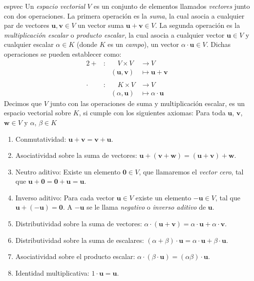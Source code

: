 \begin{definicion}{}{espvec}
    Un \emph{espacio vectorial} $V$ es un conjunto de elementos llamados \emph{vectores} junto con dos operaciones. La primera operación es la \emph{suma}, la cual asocia a cualquier par de vectores $\mathbf{u}, \mathbf{v} \in V$ un vector suma $\mathbf{u} + \mathbf{v} \in V$. La segunda operación es la \emph{multiplicación escalar} o \emph{producto escalar}, la cual asocia a cualquier vector $\mathbf{u} \in V$ y cualquier escalar $\alpha \in K$ (donde $K$ es un \emph{campo}), un vector $\alpha \cdot \mathbf{u} \in V$. Dichas operaciones se pueden establecer como:
    \begin{alignat*}{2}
        + &: & \quad V \times V & \longrightarrow V \\
        & & (\mathbf{u}, \mathbf{v}) & \longmapsto \mathbf{u} + \mathbf{v} \\
        & \\
        \cdot &: & \quad K \times V & \longrightarrow V \\
        & & (\alpha, \mathbf{u}) & \longmapsto \alpha \cdot \mathbf{u}
    \end{alignat*}
    Decimos que $V$ junto con las operaciones de suma y multiplicación escalar, es un espacio vectorial sobre $K$, si cumple con los siguientes axiomas: Para toda $\mathbf{u}$, $\mathbf{v}$, $\mathbf{w} \in V$ y $\alpha$, $\beta \in K$
    \begin{enumerate}[label=\roman*), topsep=6pt, itemsep=0pt]
        \item Conmutatividad: $\mathbf{u} + \mathbf{v} = \mathbf{v} + \mathbf{u}$.
        \item Asociatividad sobre la suma de vectores: $\mathbf{u} + (\mathbf{v} + \mathbf{w}) = (\mathbf{u} + \mathbf{v}) + \mathbf{w}$.
        \item Neutro aditivo: Existe un elemento $\mathbf{0} \in V$, que llamaremos el \emph{vector cero}, tal que $\mathbf{u} + \mathbf{0} = \mathbf{0} + \mathbf{u} = \mathbf{u}$.
        \item Inverso aditivo: Para cada vector $\mathbf{u} \in V$ existe un elemento $-\mathbf{u} \in V$, tal que $\mathbf{u} + (-\mathbf{u}) = \mathbf{0}$. A $-\mathbf{u}$ se le llama \emph{negativo} o \emph{inverso aditivo} de $\mathbf{u}$.
        \item Distributividad sobre la suma de vectores: $\alpha \cdot (\mathbf{u} + \mathbf{v}) = \alpha \cdot \mathbf{u} + \alpha \cdot \mathbf{v}$.
        \item Distributividad sobre la suma de escalares: $(\alpha + \beta) \cdot \mathbf{u} = \alpha \cdot \mathbf{u} + \beta \cdot \mathbf{u}$.
        \item Asociatividad sobre el producto escalar: $\alpha \cdot (\beta \cdot \mathbf{u}) = (\alpha \beta) \cdot \mathbf{u}$.
        \item Identidad multiplicativa: $1 \cdot \mathbf{u} = \mathbf{u}$.
    \end{enumerate}
\end{definicion}

